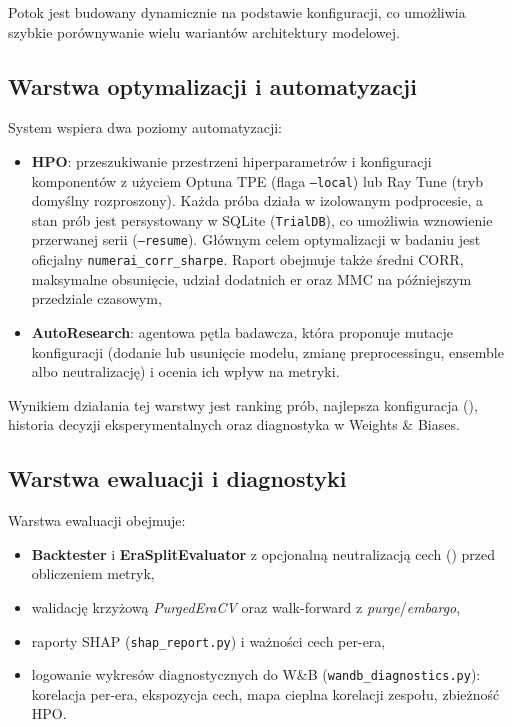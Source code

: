 \documentclass[12pt,a4paper]{report}
\begin{document}
Potok jest budowany dynamicznie na podstawie konfiguracji, co umożliwia szybkie
porównywanie wielu wariantów architektury modelowej.

\subsection{Warstwa optymalizacji i automatyzacji}
System wspiera dwa poziomy automatyzacji:
\begin{itemize}\item \textbf{HPO}: przeszukiwanie przestrzeni hiperparametrów i konfiguracji komponentów
    z użyciem Optuna TPE (flaga \texttt{--local}) lub Ray Tune (tryb domyślny rozproszony).
    Każda próba działa w izolowanym podprocesie, a stan prób jest persystowany w SQLite
    (\texttt{TrialDB}), co umożliwia wznowienie przerwanej serii (\texttt{--resume}).
    Głównym celem optymalizacji w badaniu jest oficjalny
    \texttt{numerai\_corr\_sharpe}. Raport obejmuje także średni CORR, maksymalne
    obsunięcie, udział dodatnich er oraz MMC na późniejszym przedziale czasowym,
\item \textbf{AutoResearch}: agentowa pętla badawcza, która proponuje
    mutacje konfiguracji (dodanie lub usunięcie modelu, zmianę preprocessingu,
    ensemble albo neutralizację) i ocenia ich wpływ na metryki.\end{itemize}

Wynikiem działania tej warstwy jest ranking prób, najlepsza konfiguracja
(),
historia decyzji eksperymentalnych oraz diagnostyka w Weights \& Biases.

\subsection{Warstwa ewaluacji i diagnostyki}
Warstwa ewaluacji obejmuje:
\begin{itemize}\item \textbf{Backtester} i \textbf{EraSplitEvaluator} z opcjonalną
    neutralizacją cech () przed obliczeniem metryk,
\item walidację krzyżową \textit{PurgedEraCV} oraz walk-forward z
    \textit{purge}/\textit{embargo},
\item raporty SHAP (\texttt{shap\_report.py}) i ważności cech per-era,
\item logowanie wykresów diagnostycznych do W\&B (\texttt{wandb\_diagnostics.py}):
    korelacja per-era, ekspozycja cech, mapa cieplna korelacji zespołu, zbieżność HPO.\end{itemize}
\end{document}
